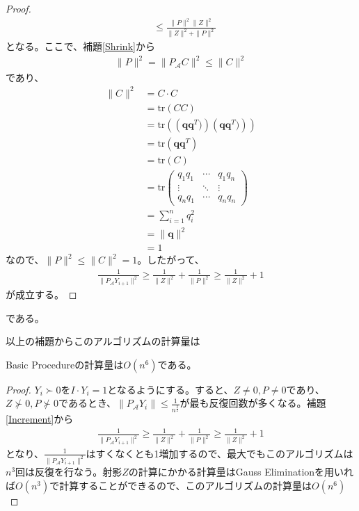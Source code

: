 \begin{proof}
\begin{align*}
                                  & \leq \frac{\|P\|^2 \|Z\|^2}{\|Z\|^2 + \|P\|^2}
  \end{align*}
  となる。ここで、補題\ref{Shrink}から
  \begin{align*}
    \|P\|^2 = \|P_\mathcal{A} C\|^2 \leq \|C\|^2
  \end{align*}
  であり、
  \begin{align*}
    \|C\|^2 & = C \cdot C \\
            & = \mathrm{tr} \left(C C\right) \\
            & = \mathrm{tr} \left(\left(\mathbf{q} \mathbf{q}^T)\right) \left(\mathbf{q} \mathbf{q}^T)\right)\right) \\
            & = \mathrm{tr} \left(\mathbf{q} \mathbf{q}^T\right) \\
            & = \mathrm{tr} \left(C\right) \\
            & = \mathrm{tr} \left(
                              \begin{array}{ccc}
                                q_1 q_1 & \cdots & q_1 q_n \\
                                \vdots  & \ddots & \vdots \\
                                q_n q_1 & \cdots & q_n q_n
                              \end{array}
                            \right) \\
            & = \displaystyle{\sum_{i = 1}^n} q_i^2 \\
            & = \|\mathbf{q}\|^2 \\
            & = 1
  \end{align*}
  なので、$\|P\|^2 \leq \|C\|^2 = 1$。したがって、
  \begin{align*}
    \frac{1}{\|P_\mathcal{A} Y_{i + 1}\|^2} \geq \frac{1}{\|Z\|^2} + \frac{1}{\|P\|^2} \geq \frac{1}{\|Z\|^2} + 1
  \end{align*}
  が成立する。
\end{proof}
である。

以上の補題からこのアルゴリズムの計算量は
\begin{theorem} \label{BasicProcedureOrder}
  Basic Procedureの計算量は$O (n^6)$である。
\end{theorem}
\begin{proof}
  $Y_i \succ 0$を$I \cdot Y_i = 1$となるようにする。すると、$Z \not= 0, P \not= 0$であり、$Z \not\succ 0, P \not\succ 0$であるとき、$\|P_\mathcal{A} Y_i\| \leq \displaystyle{\frac{1}{n^\frac{3}{2}}}$が最も反復回数が多くなる。補題\ref{Increment}から
  \begin{align*}
    \frac{1}{\|P_\mathcal{A} Y_{i + 1}\|^2} \geq \frac{1}{\|Z\|^2} + \frac{1}{\|P\|^2} \geq \frac{1}{\|Z\|^2} + 1
  \end{align*}
  となり、$\displaystyle{\frac{1}{\|P_\mathcal{A} Y_{i + 1}\|^2}}$はすくなくとも1増加するので、最大でもこのアルゴリズムは$n^3$回は反復を行なう。射影$Z$の計算にかかる計算量はGauss Eliminationを用いれば$O (n^3)$で計算することができるので、このアルゴリズムの計算量は$O(n^6)$
\end{proof}


